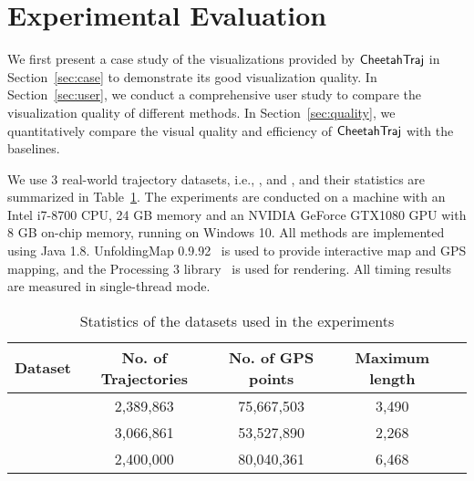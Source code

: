 \section{Experimental Evaluation}\label{sec:exp}

We first present a case study of the visualizations provided by $\mathsf{CheetahTraj}$ in Section~\ref{sec:case} to demonstrate its good visualization quality. In Section~\ref{sec:user}, we conduct a comprehensive user study to compare the visualization quality of different methods. In Section~\ref{sec:quality}, we quantitatively compare the visual quality and efficiency of $\mathsf{CheetahTraj}$ with the baselines.




 We use 3 real-world trajectory datasets, i.e., \pt{}, \sz{} and \cd{}, and their statistics are summarized in Table~\ref{tab:dataset}. The experiments are conducted on a machine with an Intel i7-8700 CPU, 24 GB memory and an NVIDIA GeForce GTX1080 GPU with 8 GB on-chip memory, running on Windows 10. All methods are implemented using Java 1.8. UnfoldingMap 0.9.92~\cite{ufmaps} is used to provide interactive map and GPS mapping, and the Processing 3 library~\cite{p3} is used for rendering. All timing results are measured in single-thread mode.

\begin{table}
	\centering
	\small
	\caption{Statistics of the datasets used in the experiments}
	\vspace{-3mm}
	\begin{tabular}{|c|c|c|c|c|} \hline
		Dataset & No. of Trajectories  & No. of GPS points  & Maximum length  \\ \hline
		\pt{}& 2,389,863 & 75,667,503 & 3,490 \\ \hline
		\sz{}& 3,066,861 & 53,527,890 & 2,268 \\ \hline
		\cd{}& 2,400,000 & 80,040,361 & 6,468 \\ \hline
	\end{tabular}	\label{tab:dataset}
	\vspace{-5mm}
\end{table}


